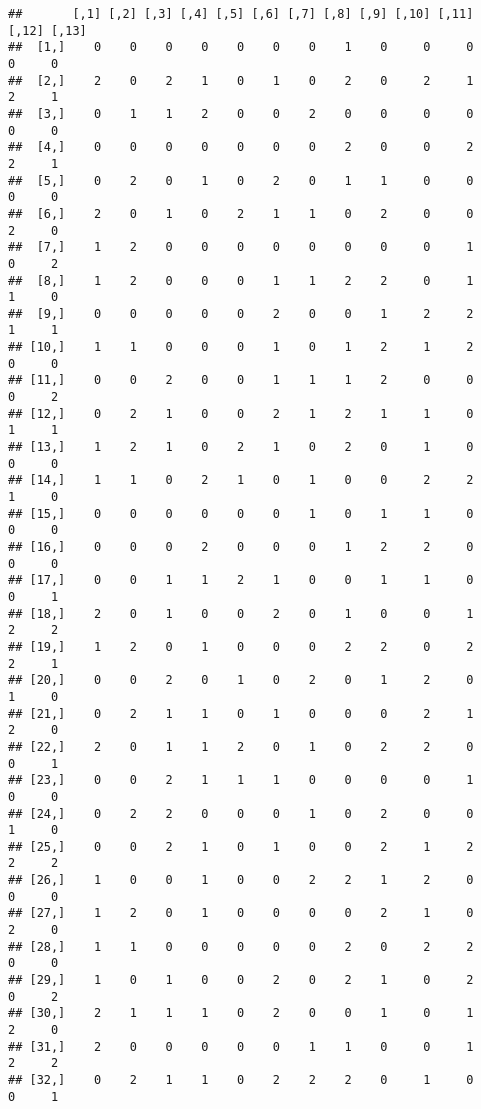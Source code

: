 \documentclass[
]{article}
\begin{document}
\begin{verbatim}
##       [,1] [,2] [,3] [,4] [,5] [,6] [,7] [,8] [,9] [,10] [,11] [,12] [,13]
##  [1,]    0    0    0    0    0    0    0    1    0     0     0     0     0
##  [2,]    2    0    2    1    0    1    0    2    0     2     1     2     1
##  [3,]    0    1    1    2    0    0    2    0    0     0     0     0     0
##  [4,]    0    0    0    0    0    0    0    2    0     0     2     2     1
##  [5,]    0    2    0    1    0    2    0    1    1     0     0     0     0
##  [6,]    2    0    1    0    2    1    1    0    2     0     0     2     0
##  [7,]    1    2    0    0    0    0    0    0    0     0     1     0     2
##  [8,]    1    2    0    0    0    1    1    2    2     0     1     1     0
##  [9,]    0    0    0    0    0    2    0    0    1     2     2     1     1
## [10,]    1    1    0    0    0    1    0    1    2     1     2     0     0
## [11,]    0    0    2    0    0    1    1    1    2     0     0     0     2
## [12,]    0    2    1    0    0    2    1    2    1     1     0     1     1
## [13,]    1    2    1    0    2    1    0    2    0     1     0     0     0
## [14,]    1    1    0    2    1    0    1    0    0     2     2     1     0
## [15,]    0    0    0    0    0    0    1    0    1     1     0     0     0
## [16,]    0    0    0    2    0    0    0    1    2     2     0     0     0
## [17,]    0    0    1    1    2    1    0    0    1     1     0     0     1
## [18,]    2    0    1    0    0    2    0    1    0     0     1     2     2
## [19,]    1    2    0    1    0    0    0    2    2     0     2     2     1
## [20,]    0    0    2    0    1    0    2    0    1     2     0     1     0
## [21,]    0    2    1    1    0    1    0    0    0     2     1     2     0
## [22,]    2    0    1    1    2    0    1    0    2     2     0     0     1
## [23,]    0    0    2    1    1    1    0    0    0     0     1     0     0
## [24,]    0    2    2    0    0    0    1    0    2     0     0     1     0
## [25,]    0    0    2    1    0    1    0    0    2     1     2     2     2
## [26,]    1    0    0    1    0    0    2    2    1     2     0     0     0
## [27,]    1    2    0    1    0    0    0    0    2     1     0     2     0
## [28,]    1    1    0    0    0    0    0    2    0     2     2     0     0
## [29,]    1    0    1    0    0    2    0    2    1     0     2     0     2
## [30,]    2    1    1    1    0    2    0    0    1     0     1     2     0
## [31,]    2    0    0    0    0    0    1    1    0     0     1     2     2
## [32,]    0    2    1    1    0    2    2    2    0     1     0     0     1

\end{verbatim}
\end{document}
